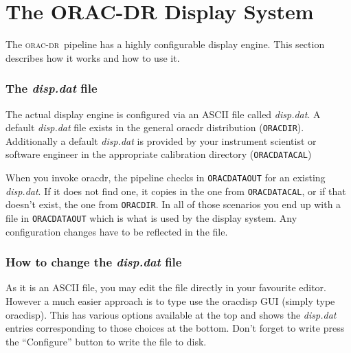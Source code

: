 \documentclass[twoside,11pt]{article}
\newcommand{\xlabel}[1]{}
\renewcommand{\_}{\texttt{\symbol{95}}}
\newcommand{\oracdr}{\textsc{orac-dr}}
\begin{document}
\section{\xlabel{display_system}The ORAC-DR Display System\label{The_ORAC-DR_Display_System}}

The \oracdr\ pipeline has a highly configurable display engine. This
section describes how it works and how to use it.

\subsubsection*{The \emph{disp.dat} file\label{The_ORAC-DR_Display_System_The_disp_dat_file}}

The actual display engine is configured via an ASCII file called
\emph{disp.dat}. A default \emph{disp.dat} file exists in the general oracdr
distribution (\texttt{ORAC\_DIR}). Additionally a default \emph{disp.dat} is provided
by your instrument scientist or software engineer in the appropriate
calibration directory (\texttt{ORAC\_DATA\_CAL})



When you invoke oracdr, the pipeline checks in \texttt{ORAC\_DATA\_OUT} for an
existing \emph{disp.dat}. If it does not find one, it copies in the one from
\texttt{ORAC\_DATA\_CAL}, or if that doesn't exist, the one from \texttt{ORAC\_DIR}. In
all of those scenarios you end up with a file in \texttt{ORAC\_DATA\_OUT} which
is what is used by the display system. Any configuration changes have
to be reflected in the file.

\subsubsection*{How to change the \emph{disp.dat} file\label{The_ORAC-DR_Display_System_How_to_change_the_disp_dat_file}}

As it is an ASCII file, you may edit the file directly in your
favourite editor. However a much easier approach is to type use the
oracdisp GUI (simply type oracdisp). This has various options
available at the top and shows the \emph{disp.dat} entries corresponding to
those choices at the bottom. Don't forget to write press the
``Configure'' button to write the file to disk.
\end{document}
